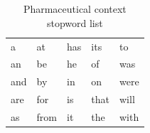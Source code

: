 \chapter{}



   \begin{figure}[hpb]
   
      \centering
     
      \label{figurelabel}
   \end{figure}
   
   
\begin{table}[]
\setlength{\tabcolsep}{8pt}
\centering
\caption{Pharmaceutical context stopword list}
\label{table:app-stopwords}
\begin{tabular}{|lllll|}
\hline
a   & at   & has & its  & to   \\
an  & be   & he  & of   & was  \\
and & by   & in  & on   & were \\
are & for  & is  & that & will \\
as  & from & it  & the  & with \\ \hline
\end{tabular}
\end{table}




